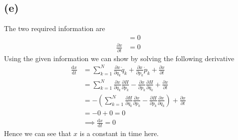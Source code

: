\documentclass[letter, 10pts]{article}
\begin{document}
\subsection*{(e)}
The two required information are 
\begin{align*}
	[H,x] &= 0 \\
	\frac{\partial x}{\partial t} &= 0 
\end{align*}
Using the given information we can show by solving the following derivative
\begin{align*}
\frac{\mathrm{d} x}{\mathrm{d} t} &= \sum_{k = 1}^{N} 
\frac{\partial x}{\partial q_k} \dot q_k  + 
\frac{\partial x}{\partial p_k} \dot p_k  + 
\frac{\partial x}{\partial t}
\\	
&= 
\sum_{k = 1}^{N} 
\frac{\partial x}{\partial q_k} 
\frac{\partial H}{\partial p_k}  -
\frac{\partial x}{\partial p_k} 
\frac{\partial H}{\partial q_k}
+ 
\frac{\partial x}{\partial t}
\\	
&= 
- \left(\sum_{k = 1}^{N} 
\frac{\partial H}{\partial q_k}
\frac{\partial x}{\partial p_k} 
-
\frac{\partial H}{\partial p_k}  
\frac{\partial x}{\partial q_k} 
\right)
+ 
\frac{\partial x}{\partial t}
\\	
&= -0 + 0 = 0 \\ &\implies
\frac{\mathrm{d} x}{\mathrm{d} t} = 0 
\end{align*}
Hence we can see that $x$ is a constant in time here.  
\end{document}
